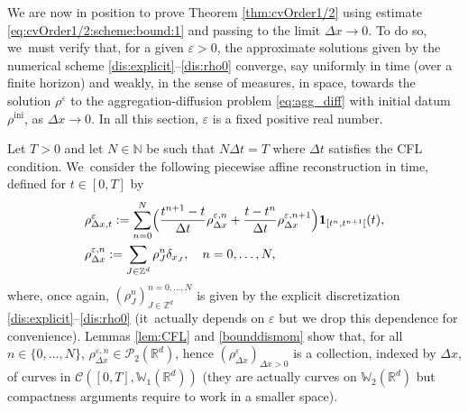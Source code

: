 \documentclass[JEP,XML,SOM,Unicode, NoFloatCountersInSection,published]{cedram}
\newcommand{\ini}{\mathrm{ini}}
\def\NN{\mathbb{N}}
\def\RR{\mathbb{R}}
\def\ZZ{\mathbb{Z}}
\def\WW{\mathbb{W}}
\def\eps{\varepsilon}
\def\dt{\Delta t}
\def\dx{\Delta x}
\def\calC{{\mathcal C}}
\def\calP{{\mathcal P}}
\theoremstyle{plain}
\theoremstyle{definition}
\begin{document}
We are now in position to prove Theorem \ref{thm:cvOrder1/2} using estimate \eqref{eq:cvOrder1/2:scheme:bound:1} and passing to the limit $\dx \to 0$. To do so, we~must verify that, for a given $\eps >0$, the approximate solutions given by the numerical scheme \eqref{dis:explicit}--\eqref{dis:rho0} converge, say uniformly in time (over a finite horizon) and weakly, in the sense of measures, in space, towards the solution $\rho^\eps$ to the aggregation-diffusion problem \eqref{eq:agg_diff} with initial datum $\rho^{\ini}$, as $\dx \to 0$. In all this section, $\eps$ is a fixed positive real number.

Let $T > 0$ and let $N \in \NN$ be such that $N\dt = T$ where $\Delta t$ satisfies the CFL condition. We~consider the following piecewise affine reconstruction in time, defined for $t \in [0,T]$ by
\begin{subequations}
\begin{align}
& \rho_{\dx, t}^{\eps} := \sum_{n=0}^N \Bigl(\frac{t^{n+1} - t}{\dt} \rho_{\dx}^{\eps,n} + \frac{t-t^n}{\dt}\rho_{\dx}^{\eps,n+1}\Bigr) {\mathbf 1}_{[t^n, t^{n+1}[}(t), \label{rhoaff}\\
& \rho_{\dx}^{\eps,n} := \sum_{J\in \ZZ^d} \rho_J^n \delta_{x_J}, \quad n = 0, \ldots, N,
\end{align}
\end{subequations}
where, once again, $(\rho_J^n)_{J\in\ZZ^d}^{n=0,\ldots,N}$ is given by the explicit discretization \eqref{dis:explicit}--\eqref{dis:rho0} (it~actually depends on $\eps$ but we drop this dependence for convenience). Lemmas \ref{lem:CFL} and \ref{bounddismom} show that, for all $n \in \{0,\ldots,N\}$, $\rho_{\dx}^{\eps,n} \in \calP_2(\RR^d)$, hence $(\rho_{\dx}^\eps)_{\dx > 0}$ is a collection, indexed by $\dx$, of curves in $\calC([0,T], \WW_1(\RR^d))$ (they are actually curves on $\WW_2(\RR^d)$ but compactness arguments require to work in a smaller space).
\end{document}
